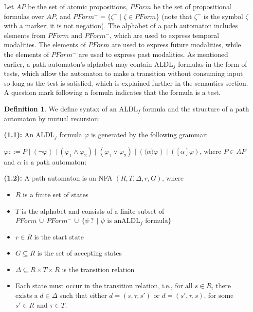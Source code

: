\documentclass{lmcs}
\theoremstyle{definition}
\newtheorem{definition}[thm]{Definition}
\newcommand{\dbox}[1]{\langle #1 \rangle}
\newcommand{\bbox}[1]{[ #1 ]}
\DeclareMathOperator{\?}{?}
\begin{document}
  Let $AP$ be the set of atomic propositions, $PForm$ be the set of propositional formulas over $AP$, and $PForm^- = \{ \zeta^- \mid \zeta \in PForm \}$ (note that $\zeta^-$ is the symbol $\zeta$ with a marker; it is not negation). The alphabet of a path automaton includes elements from
    $PForm$ and $PForm^-$, which are used to express temporal modalities. The elements of
    $PForm$ are used to express future modalities, while the elements of $PForm^-$ are used to
    express past modalities. As mentioned earlier, a path automaton's alphabet may contain ALDL$_f$ formulas in the form
    of tests, which allow the automaton to make a transition without consuming input so long as the test is
    satisfied, which is explained further in the semantics section.
    A question mark following a formula indicates that the formula is a test.

    \begin{definition}\label{def:aldlf_mutual} We define syntax of an ALDL$_f$ formula and the structure of a path
        automaton by mutual recursion:


    \textbf{(1.1):} An ALDL$_f$ formula $\varphi$ is generated by the following grammar:

  $\varphi ::= P \mid (\neg \varphi) \mid (\varphi_1 \wedge \varphi_2) \mid (\varphi_1 \vee \varphi_2)
  \mid (\dbox{\alpha} \varphi) \mid (\bbox{\alpha} \varphi)$, where $P \in AP$ and $\alpha$ is a path automaton:


    \textbf{(1.2):} A path automaton is an NFA $(R,T,\Delta,r,G)$, where
    \begin{itemize}
        \item $R$ is a finite set of states
        \item $T$ is the alphabet and consists of a finite subset of $PForm \, \cup \, PForm^- \, \cup \, \{ \psi \? \mid \psi \text{ is an} \allowbreak
        \text{ALDL$_f$ formula} \}$
        \item $r \in R$ is the start state
        \item $G \subseteq R$ is the set of accepting states
        \item $\Delta \subseteq R \times T \times R$ is the transition relation
        \item Each state must occur in the transition relation, i.e., for all $s \in R$, there exists a $d \in \Delta$ such that either $d = (s, \tau, s')$ or $d = (s', \tau, s)$, for some $s' \in R$ and $\tau \in T$.
    \end{itemize}

\end{definition}
\end{document}
